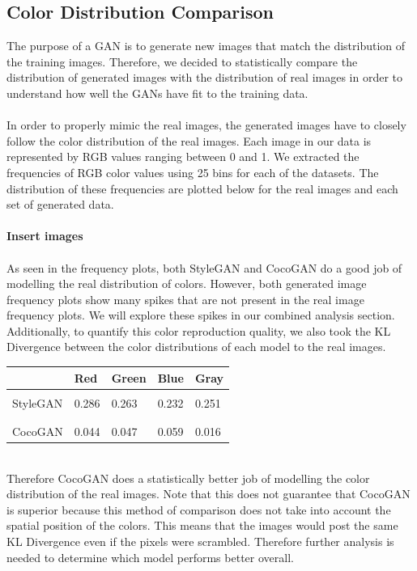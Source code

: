 \documentclass[12pt]{article}
\begin{document}
\begin{multicols*}{2}
        \subsection{Color Distribution Comparison}
        \label{subsec:colorDistribution}

        The purpose of a GAN is to generate new images that match the distribution of the training images. Therefore, we decided to statistically compare the distribution of generated images with the distribution of real images in order to understand how well the GANs have fit to the training data.
        \\\\
        In order to properly mimic the real images, the generated images have to closely follow the color distribution of the real images. Each image in our data is represented by RGB values ranging between 0 and 1. We extracted the frequencies of RGB color values using 25 bins for each of the datasets. The distribution of these frequencies are plotted below for the real images and each set of generated data.
        \\\\
        \textbf{Insert images}
        \\\\
        As seen in the frequency plots, both StyleGAN and CocoGAN do a good job of modelling the real distribution of colors. However, both generated image frequency plots show many spikes that are not present in the real image frequency plots. We will explore these spikes in our combined analysis section. Additionally, to quantify this color reproduction quality, we also took the KL Divergence between the color distributions of each model to the real images. \\
        \begin{table}[h]
        \centering
        \begin{tabular}{lllll}
                 & Red & Green & Blue & Gray \\ \hline \\
        StyleGAN & 0.286    & 0.263      & 0.232     &  0.251    \\ \\ \hline \\
        CocoGAN  & 0.044    & 0.047      & 0.059     &  0.016
        \end{tabular}
        \end{table}
        \\
        Therefore CocoGAN does a statistically better job of modelling the color distribution of the real images. Note that this does not guarantee that CocoGAN is superior because this method of comparison does not take into account the spatial position of the colors. This means that the images would post the same KL Divergence even if the pixels were scrambled. Therefore further analysis is needed to determine which model performs better overall.



\end{multicols*}
\end{document}
